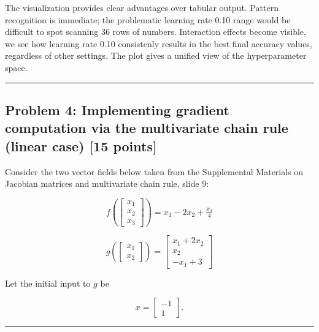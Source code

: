 \documentclass[
  letterpaper,
  DIV=11,
  numbers=noendperiod]{scrartcl}
\begin{document}
The visualization provides clear advantages over tabular output. Pattern
recognition is immediate; the problematic learning rate 0.10 range would
be difficult to spot scanning 36 rows of numbers. Interaction effects
become visible, we see how learning rate 0.10 consistenly results in the
best final accuracy values, regardless of other settings. The plot gives
a unified view of the hyperparameter space.

\begin{center}\rule{0.5\linewidth}{0.5pt}\end{center}

\subsection{Problem 4: Implementing gradient computation via the
multivariate chain rule (linear case) {[}15
points{]}}\label{problem-4-implementing-gradient-computation-via-the-multivariate-chain-rule-linear-case-15-points}

Consider the two vector fields below taken from the Supplemental
Materials on Jacobian matrices and multivariate chain rule, slide 9:

\[
f\!\left(\begin{bmatrix} x_1 \\ x_2 \\ x_3 \end{bmatrix}\right) = x_1 - 2x_2 + \tfrac{x_3}{4}
\]

\[
g\!\left(\begin{bmatrix} x_1 \\ x_2 \end{bmatrix}\right) =
\begin{bmatrix}
x_1 + 2x_2 \\
x_2 \\
-x_1 + 3
\end{bmatrix}
\]

Let the initial input to \(g\) be

\[
x = \begin{bmatrix} -1 \\ 1 \end{bmatrix}.
\]

\begin{center}\rule{0.5\linewidth}{0.5pt}\end{center}
\end{document}
